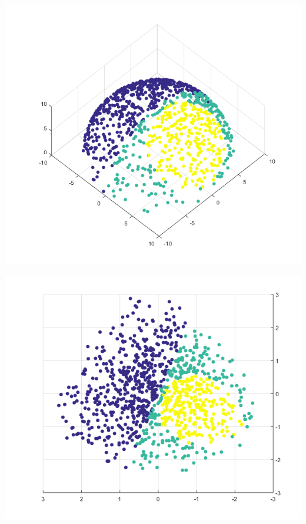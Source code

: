 \documentclass[a0,portrait]{a0poster}
\begin{document}
\begin{multicols}{3}
    \begin{minipage}[b]{0.5\linewidth}
        \begin{center}
            \includegraphics[width=\linewidth]{figures/sphere.png}
        \end{center}
    \end{minipage}
    \begin{minipage}[b]{0.5\linewidth}
        \begin{center}
            \includegraphics[width=\linewidth]{figures/sphere_result.png}
        \end{center}
    \end{minipage}


\end{multicols}
\end{document}
